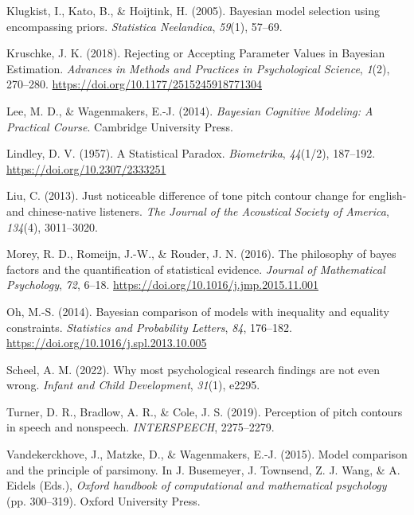 \documentclass[
  doc,
  floatsintext,
  longtable,
  nolmodern,
  notxfonts,
  notimes,
  colorlinks=true,linkcolor=blue,citecolor=blue,urlcolor=blue]{apa7}
\newlength{\cslhangindent}
\newenvironment{CSLReferences}[2] %
 {\begin{list}{}{%
  \setlength{\itemindent}{0pt}
  \setlength{\leftmargin}{0pt}
  \setlength{\parsep}{0pt}
  \ifodd #1
   \setlength{\leftmargin}{\cslhangindent}
   \setlength{\itemindent}{-1\cslhangindent}
  \fi
  \setlength{\itemsep}{#2\baselineskip}}}
 {\end{list}}
\begin{document}
\begin{CSLReferences}{1}{0}
Klugkist, I., Kato, B., \& Hoijtink, H. (2005). Bayesian model selection
using encompassing priors. \emph{Statistica Neelandica}, \emph{59}(1),
57--69.

Kruschke, J. K. (2018). Rejecting or {Accepting Parameter Values} in
{Bayesian Estimation}. \emph{Advances in Methods and Practices in
Psychological Science}, \emph{1}(2), 270--280.
\url{https://doi.org/10.1177/2515245918771304}

Lee, M. D., \& Wagenmakers, E.-J. (2014). \emph{Bayesian {Cognitive
Modeling}: {A Practical Course}}. Cambridge University Press.

Lindley, D. V. (1957). A {Statistical Paradox}. \emph{Biometrika},
\emph{44}(1/2), 187--192. \url{https://doi.org/10.2307/2333251}

Liu, C. (2013). Just noticeable difference of tone pitch contour change
for english-and chinese-native listeners. \emph{The Journal of the
Acoustical Society of America}, \emph{134}(4), 3011--3020.

Morey, R. D., Romeijn, J.-W., \& Rouder, J. N. (2016). The philosophy of
bayes factors and the quantification of statistical evidence.
\emph{Journal of Mathematical Psychology}, \emph{72}, 6--18.
\url{https://doi.org/10.1016/j.jmp.2015.11.001}

Oh, M.-S. (2014). Bayesian comparison of models with inequality and
equality constraints. \emph{Statistics and Probability Letters},
\emph{84}, 176--182. \url{https://doi.org/10.1016/j.spl.2013.10.005}

Scheel, A. M. (2022). Why most psychological research findings are not
even wrong. \emph{Infant and Child Development}, \emph{31}(1), e2295.

Turner, D. R., Bradlow, A. R., \& Cole, J. S. (2019). Perception of
pitch contours in speech and nonspeech. \emph{INTERSPEECH}, 2275--2279.

Vandekerckhove, J., Matzke, D., \& Wagenmakers, E.-J. (2015). Model
comparison and the principle of parsimony. In J. Busemeyer, J. Townsend,
Z. J. Wang, \& A. Eidels (Eds.), \emph{Oxford handbook of computational
and mathematical psychology} (pp. 300--319). Oxford University Press.


\end{CSLReferences}
\end{document}
